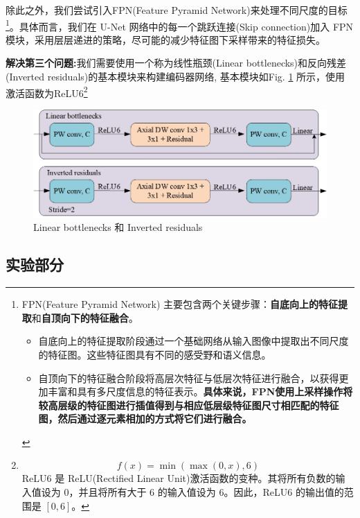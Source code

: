 \documentclass[a4paper]{ctexart}
\begin{document}
		除此之外，我们尝试引入FPN(Feature Pyramid Network)\cite{lin2017feature}来处理不同尺度的目标\footnote{FPN(Feature Pyramid Network) 主要包含两个关键步骤：\textbf{自底向上的特征提取}和\textbf{自顶向下的特征融合}。
		\begin{itemize}
			\item [1)]
				自底向上的特征提取阶段通过一个基础网络从输入图像中提取出不同尺度的特征图。这些特征图具有不同的感受野和语义信息。
			
			\item [2)]
				自顶向下的特征融合阶段将高层次特征与低层次特征进行融合，以获得更加丰富和具有多尺度信息的特征表示。\textbf{具体来说，FPN使用上采样操作将较高层级的特征图进行插值得到与相应低层级特征图尺寸相匹配的特征图，然后通过逐元素相加的方式将它们进行融合。}
		\end{itemize}
		
		}。具体而言，我们在 U-Net 网络中的每一个跳跃连接(Skip connection)加入 FPN 模块，采用层层递进的策略，尽可能的减少特征图下采样带来的特征损失。
		
		\textbf{解决第三个问题:}我们需要使用一个称为线性瓶颈(Linear bottlenecks)和反向残差(Inverted residuals)的基本模块来构建编码器网络, 基本模块如Fig. \ref{fig: Base module} 所示，使用激活函数为ReLU6\footnote{
		\begin{equation*}
			f(x) = \min \left( \max \left(0, x\right), 6\right)
		\end{equation*}
		ReLU6 是 ReLU(Rectified Linear Unit)激活函数的变种。其将所有负数的输入值设为 0，并且将所有大于 6 的输入值设为 6。因此，ReLU6 的输出值的范围是 $\left[0, 6\right]$。}
		
		\begin{figure}[htbp]
			\centering
				\includegraphics[width=0.7\linewidth]{picture/LLIE/My Architecture/Base module}
				\caption{Linear bottlenecks 和 Inverted residuals}
				\label{fig: Base module}	
		\end{figure}

		\subsection*{实验部分}
		
\end{document}
